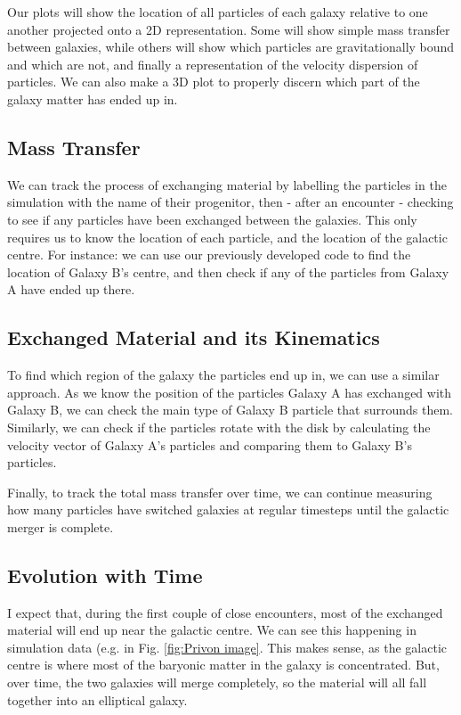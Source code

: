 \documentclass[linenumbers]{aastex631} %
\begin{document}
Our plots will show the location of all particles of each galaxy relative to one another projected onto a 2D representation. Some will show simple mass transfer between galaxies, while others will show which particles are gravitationally bound and which are not, and finally a representation of the velocity dispersion of particles. We can also make a 3D plot to properly discern which part of the galaxy matter has ended up in.

\subsection{Mass Transfer}

We can track the process of exchanging material by labelling the particles in the simulation with the name of their progenitor, then - after an encounter - checking to see if any particles have been exchanged between the galaxies. This only requires us to know the location of each particle, and the location of the galactic centre. For instance: we can use our previously developed code to find the location of Galaxy B's centre, and then check if any of the particles from Galaxy A have ended up there.

\subsection{Exchanged Material and its Kinematics}

To find which region of the galaxy the particles end up in, we can use a similar approach. As we know the position of the particles Galaxy A has exchanged with Galaxy B, we can check the main type of Galaxy B particle that surrounds them. Similarly, we can check if the particles rotate with the disk by calculating the velocity vector of Galaxy A's particles and comparing them to Galaxy B's particles. 

Finally, to track the total mass transfer over time, we can continue measuring how many particles have switched galaxies at regular timesteps until the galactic merger is complete.

\subsection{Evolution with Time}

I expect that, during the first couple of close encounters, most of the exchanged material will end up near the galactic centre. We can see this happening in simulation data (e.g. in Fig. \ref{fig:Privon image}. This makes sense, as the galactic centre is where most of the baryonic matter in the galaxy is concentrated. But, over time, the two galaxies will merge completely, so the material will all fall together into an elliptical galaxy.
\end{document}
